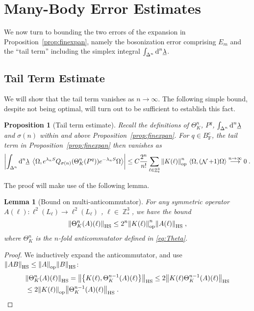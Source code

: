 \documentclass[12pt,a4paper]{article}
\numberwithin{equation}{section}
\newcommand{\ulambda}{\underline{\lambda}}
\newcommand{\1}{\mathbb{I}}
\newcommand{\di}{\textnormal{d}}
\newcommand{\F}{\mathrm{F}}
\newcommand{\HS}{\mathrm{HS}}
\DeclareMathOperator{\Z}{\mathbb{Z}}
\DeclareMathOperator{\NN}{\mathcal{N}}
\newcommand{\eva}[1]{\left\langle #1 \right\rangle}
\theoremstyle{plain}
\newtheorem{lemma}[theorem]{Lemma}
\newtheorem{proposition}[theorem]{Proposition}
\theoremstyle{definition}
\theoremstyle{remark}
\theoremstyle{plain}
\theoremstyle{definition}
\theoremstyle{remark}
\begin{document}
\section{Many-Body Error Estimates}
\label{subsec:manybody_estimates}

We now turn to bounding the two errors of the expansion in Proposition~\ref{prop:finexpan}, namely the bosonization error comprising $ E_m $ and the ``tail term'' including the simplex integral $ \int_{\Delta^n} \di^n \ulambda $.


\subsection{Tail Term Estimate}
\label{subsec:tailestimate}

We will show that the tail term vanishes as $ n \to \infty $. The following simple bound, despite not being optimal, will turn out to be sufficient to establish this fact.

\begin{proposition}[Tail term estimate]\label{prop:headerr}
Recall the definitions of $ \Theta^n_K $, $ P^q $, $ \int_{\Delta^n} \di^n \ulambda $ and $ \sigma(n) $ within and above Proposition~\ref{prop:finexpan}. For $q \in B^c_{\F}$, the tail term in Proposition~\ref{prop:finexpan} then vanishes as
\begin{equation}\label{eq:headest}
	\abs{\int_{\Delta^n} \di^n\underline{\lambda} \;
		\eva{\Omega, e^{\lambda_n S}Q_{\sigma(n)}(\Theta^n_{K}(P^q)) e^{-\lambda_n S} \Omega} }
	\leq C \frac{2^n}{n!} \sum_{\ell \in \Z^3_*} \norm{K(\ell)}^n_{\mathrm{op}} \, \eva{\Omega,(\NN+1)\Omega} \overset{n \to \infty}{\longrightarrow} 0 \;.
\end{equation}
\end{proposition}

The proof will make use of the following lemma.

\begin{lemma}[Bound on multi-anticommutator]\label{lem:multicommest}
For any symmetric operator $ A(\ell): \ell^2(L_\ell) \to \ell^2(L_\ell) $ , $ \ell \in \Z^3_* $, we have the bound
\begin{equation}
	\norm{\Theta^{n}_K(A)(\ell)}_{\HS}
	\leq 2^n \norm{K(\ell)}^{n}_{\mathrm{op}}\norm{A(\ell)}_{\HS} \;,
\end{equation}
where $\Theta^n_K$ is the $ n $-fold anticommutator defined in \eqref{eq:Theta}.
\end{lemma}

\begin{proof}
We inductively expand the anticommutator, and use $\norm{AB}_{\HS} \leq \norm{A}_{\mathrm{op}} \norm{B}_{\HS}$:
\begin{equation}
\begin{aligned}
	&\norm{\Theta^{n}_K(A)(\ell)}_{\HS}
	= \norm{\left\{K(\ell),\Theta^{n-1}_K(A)(\ell)\right\}}_{\HS}
	\leq 2 \norm{K(\ell)\Theta^{n-1}_K(A)(\ell) }_{\HS} \\
	&\leq 2 \norm{K(\ell)}_{\mathrm{op}}\norm{\Theta^{n-1}_K(A)(\ell)}_{\HS} \;.
\end{aligned}
\end{equation}
\end{proof}
\end{document}
